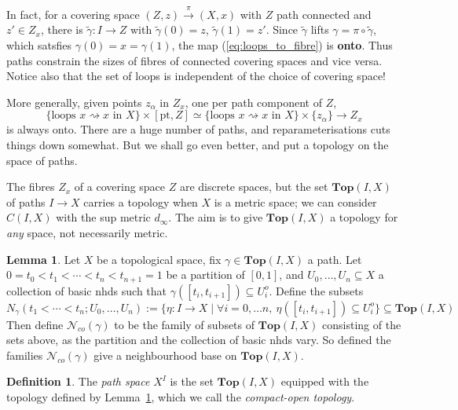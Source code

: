 \documentclass{tufte-handout}
\def\cN {\mathcal{N}}
\def\pt {\mathrm{pt}}
\def\Top {\mathbf{Top}}
\theoremstyle{definition}
\newtheorem{lemma}{Lemma}
\newtheorem{definition}{Definition}
\begin{document}
In fact, for a covering space $(Z,z)\xrightarrow{\pi} (X,x)$ with $Z$ path connected 
and $z'\in Z_x$, there is $\widetilde{\gamma}\colon I\to Z$ with $\widetilde{\gamma}(0)=z$, 
$\widetilde{\gamma}(1)=z'$. Since $\widetilde{\gamma}$ lifts $\gamma = \pi\circ \widetilde{\gamma}$, 
which satsfies $\gamma(0) = x = \gamma(1)$, the map (\ref{eq:loops_to_fibre}) is \textbf{onto}.
Thus paths constrain the sizes of fibres of connected covering spaces and vice versa. 
Notice also that the set of loops is independent of the choice of covering space!

More generally, given points $z_\alpha$ in $Z_x$,\marginnote{that is: a section of $Z\to [\pt,Z]$} one per path component of $Z$,\label{eq:fibre_quotient_of_loops}
\[
\{\text{loops }x \rightsquigarrow x\text{ in }X\}\times [\pt,Z] \simeq \{\text{loops }x \rightsquigarrow x\text{ in }X\}\times\{z_\alpha\} \to Z_x
\]
is always onto. There are a huge number of paths, and reparameterisations cuts things down somewhat. 
But we shall go even better, and put a topology on the space of paths.


The fibres $Z_x$ of a covering space $Z$ are discrete spaces, but the set 
$\Top(I,X)$ of paths $I\to X$ carries a topology when $X$ is a metric space; we can 
consider $C(I,X)$ with the sup metric $d_\infty$. The aim is to give $\Top(I,X)$ a 
topology for \emph{any} space, not necessarily metric.

\begin{lemma}\label{lemma:compact_open_base}
Let $X$ be a topological space, fix $\gamma\in \Top(I,X)$ a path. Let 
$0=t_0 < t_1 < \cdots < t_n < t_{n+1} = 1$ be a partition of $[0,1]$, and $U_0, \ldots, U_n \subseteq X$ 
a collection of basic nhds such that $\gamma([t_i,t_{i+1}]) \subseteq U_i^o$.
Define the subsets
\[
	N_\gamma(t_1<\cdots<t_n;U_0,\ldots,U_n) :=\{\eta\colon I\to X\mid\forall i=0,\ldots n,\ 
		\eta([t_i,t_{i+1}]) \subseteq U_i^o\} \subseteq \Top(I,X)
\]
Then define $\cN_{co}(\gamma)$ to be the family of subsets of $\Top(I,X)$ consisting of the sets above, as the partition and the collection of basic nhds vary. So defined the families $\cN_{co}(\gamma)$ give a neighbourhood base on $\Top(I,X)$.
\end{lemma}

\begin{definition}
The \emph{path space} $X^I$ is the set $\Top(I,X)$ equipped with the topology defined by
Lemma~\ref{lemma:compact_open_base}, which we call the \emph{compact-open topology}.
\end{definition}
\end{document}
